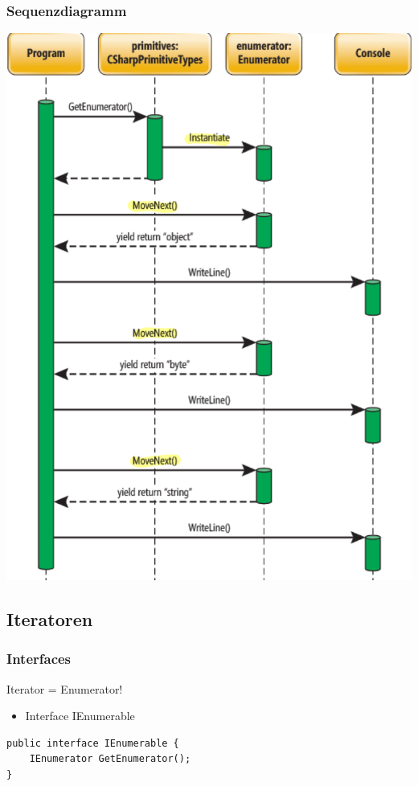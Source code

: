 \subsubsection{Sequenzdiagramm}
\begin{center}
    \includegraphics[scale=.33]{graphic/iterator/Sequenzdiagramm.png}
\end{center}


\subsection{Iteratoren}
\subsubsection{Interfaces}
Iterator = Enumerator!

\begin{itemize}
    \item Interface IEnumerable
\end{itemize}
\begin{lstlisting}
public interface IEnumerable {
    IEnumerator GetEnumerator();
}
\end{lstlisting}

